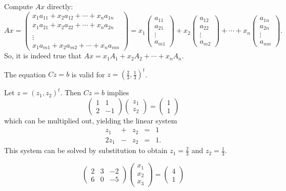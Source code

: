 Compute $Ax$ directly:
\[ Ax = \left(\begin{array}{c} x_1a_{11} + x_2a_{12} + \cdots +
x_na_{1n} \\  x_1a_{21} + x_2a_{22} + \cdots + x_na_{2n} \\
\\ \vdots \\ x_1a_{m1} + x_2a_{m2} + \cdots + x_na_{mn}
\end{array}\right) = x_1\left(\begin{array}{r} a_{11} \\ a_{21} \\
\vdots \\ a_{m1} \end{array}\right) + x_2\left(\begin{array}{r}
a_{12} \\ a_{22} \\ \vdots \\ a_{m2} \end{array}\right) + \cdots
+ x_n\left(\begin{array}{r} a_{1n} \\ a_{2n} \\
\vdots \\ a_{mn} \end{array}\right). \]
So, it is indeed true that $Ax = x_1A_1 + x_2A_2 + \cdots
+ x_nA_n$.

\newpage
{}
\ans The equation $Cz = b$ is valid for $z = (\frac{2}{3},\frac{1}{3})^t$.

\soln Let $z = (z_1,z_2)^t$.  Then $Cz = b$ implies
\[
\left(\begin{array}{rr} 1 & 1 \\ 2 & -1\end{array}\right)
\left(\begin{array}{r} z_1 \\ z_2\end{array}\right) =
\left(\begin{array}{r} 1 \\ 1\end{array}\right)
\]
which can be multiplied out, yielding the linear system
\[\begin{array}{rrrrl}
z_1 & + & z_2 & = & 1 \\
2z_1 & - & z_2 & = & 1.\end{array} \]
This system can be solved by substitution to obtain $z_1 =
\frac{2}{3}$ and $z_2 = \frac{1}{3}$.

\[
\left(\begin{array}{rrr} 2 & 3 & -2 \\ 6 & 0 & -5\end{array}\right) 
\left(\begin{array}{r} x_1 \\ x_2 \\ x_3\end{array}\right) = 
\left(\begin{array}{r} 4 \\ 1\end{array}\right)
\]


